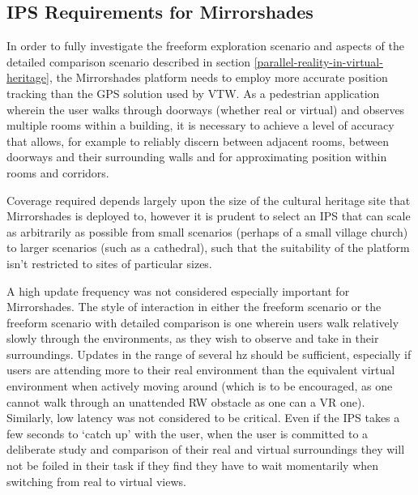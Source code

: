 
\subsection{IPS Requirements for Mirrorshades}
\label{ips-requirements-for-mirrorshades}
In order to fully investigate the freeform exploration scenario and aspects of the detailed comparison scenario described in section \ref{parallel-reality-in-virtual-heritage}, the Mirrorshades platform needs to employ more accurate position tracking than the GPS solution used by VTW. As a pedestrian application wherein the user walks through doorways (whether real or virtual) and observes multiple rooms within a building, it is necessary to achieve a level of accuracy that allows, for example to reliably discern between adjacent rooms, between doorways and their surrounding walls and for approximating position within rooms and corridors.

Coverage required depends largely upon the size of the cultural heritage site that Mirrorshades is deployed to, however it is prudent to select an IPS that can scale as arbitrarily as possible from small scenarios (perhaps of a small village church) to larger scenarios (such as a cathedral), such that the suitability of the platform isn't restricted to sites of particular sizes.

A high update frequency was not considered especially important for Mirrorshades. The style of interaction in either the freeform scenario or the freeform scenario with detailed comparison is one wherein users walk relatively slowly through the environments, as they wish to observe and take in their surroundings. Updates in the range of several hz should be sufficient, especially if users are attending more to their real environment than the equivalent virtual environment when actively moving around (which is to be encouraged, as one cannot walk through an unattended RW obstacle as one can a VR one). Similarly, low latency was not considered to be critical. Even if the IPS takes a few seconds to `catch up' with the user, when the user is committed to a deliberate study and comparison of their real and virtual surroundings they will not be foiled in their task if they find they have to wait momentarily when switching from real to virtual views.

